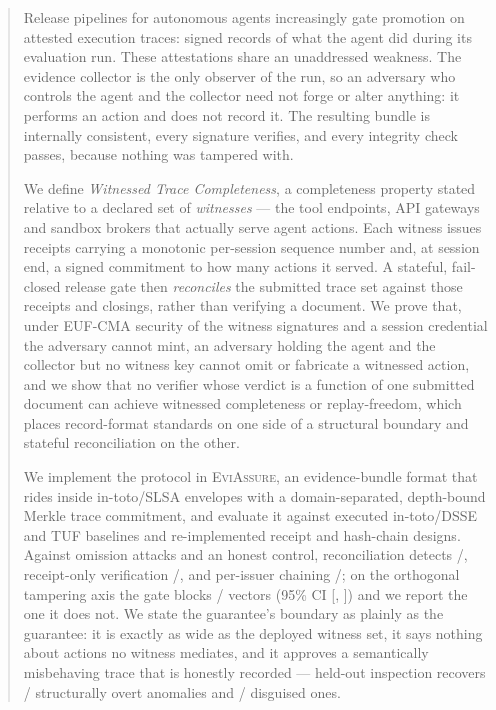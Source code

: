 \begin{abstract}
Release pipelines for autonomous agents increasingly gate promotion on
attested execution traces: signed records of what the agent did during its
evaluation run. These attestations share an unaddressed weakness. The evidence
collector is the only observer of the run, so an adversary who controls the
agent and the collector need not forge or alter anything: it performs an action
and does not record it. The resulting bundle is internally consistent, every
signature verifies, and every integrity check passes, because nothing was
tampered with.

We define \emph{Witnessed Trace Completeness}, a completeness property stated
relative to a declared set of \emph{witnesses} --- the tool endpoints, API
gateways and sandbox brokers that actually serve agent actions. Each witness
issues receipts carrying a monotonic per-session sequence number and, at
session end, a signed commitment to how many actions it served. A stateful,
fail-closed release gate then \emph{reconciles} the submitted trace set against
those receipts and closings, rather than verifying a document. We prove that,
under EUF-CMA security of the witness signatures and a session credential the
adversary cannot mint, an adversary holding the agent and the collector but no
witness key cannot omit or fabricate a witnessed action, and we show that no
verifier whose verdict is a function of one submitted document can achieve
witnessed completeness or replay-freedom, which places record-format standards
on one side of a structural boundary and stateful reconciliation on the other.

We implement the protocol in \textsc{EviAssure}, an evidence-bundle format that
rides inside in-toto/SLSA envelopes with a domain-separated, depth-bound Merkle
trace commitment, and evaluate it against executed in-toto/DSSE and TUF
baselines and re-implemented receipt and hash-chain designs. Against
\omVectors{} omission attacks and an honest control, reconciliation detects
\omWtc/\omVectors{}, receipt-only verification \omReceipts/\omVectors{}, and
per-issuer chaining \omChain/\omVectors{}; on the orthogonal tampering axis the
gate blocks \eviBlocked/\eviTotal{} vectors (95\% CI [\eviCIlo, \eviCIhi]) and
we report the one it does not. We state the guarantee's boundary as plainly as
the guarantee: it is exactly as wide as the deployed witness set, it says
nothing about actions no witness mediates, and it approves a semantically
misbehaving trace that is honestly recorded --- held-out inspection recovers
\insOvertK/\insOvertN{} structurally overt anomalies and \insStealthK/\insStealthN{}
disguised ones.
\end{abstract}

